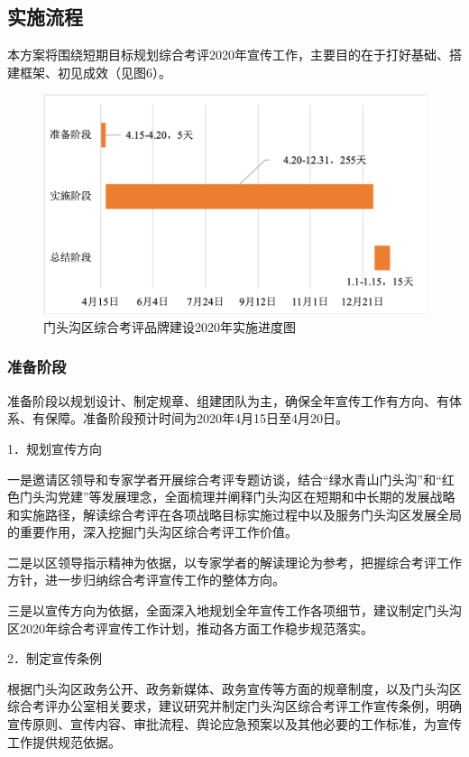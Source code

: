 \documentclass[12pt]{article} %
\begin{document}
\subsection{实施流程}
本方案将围绕短期目标规划综合考评2020年宣传工作，主要目的在于打好基础、搭建框架、初见成效（见图6）。
\begin{figure}[ht]
\centering
\includegraphics[width=\textwidth]{figures/6.png}
\caption{门头沟区综合考评品牌建设2020年实施进度图}
\label{fig:fig1}
\end{figure}

\newpage
\subsubsection{准备阶段}
准备阶段以规划设计、制定规章、组建团队为主，确保全年宣传工作有方向、有体系、有保障。准备阶段预计时间为2020年4月15日至4月20日。

1．规划宣传方向

一是邀请区领导和专家学者开展综合考评专题访谈，结合“绿水青山门头沟”和“红色门头沟党建”等发展理念，全面梳理并阐释门头沟区在短期和中长期的发展战略和实施路径，解读综合考评在各项战略目标实施过程中以及服务门头沟区发展全局的重要作用，深入挖掘门头沟区综合考评工作价值。

二是以区领导指示精神为依据，以专家学者的解读理论为参考，把握综合考评工作方针，进一步归纳综合考评宣传工作的整体方向。

三是以宣传方向为依据，全面深入地规划全年宣传工作各项细节，建议制定门头沟区2020年综合考评宣传工作计划，推动各方面工作稳步规范落实。

2．制定宣传条例

根据门头沟区政务公开、政务新媒体、政务宣传等方面的规章制度，以及门头沟区综合考评办公室相关要求，建议研究并制定门头沟区综合考评工作宣传条例，明确宣传原则、宣传内容、审批流程、舆论应急预案以及其他必要的工作标准，为宣传工作提供规范依据。
\end{document}
